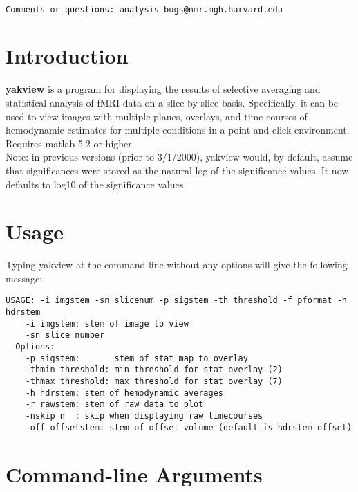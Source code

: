 \documentclass[10pt]{article}
\begin{document}
\begin{Large}
 \\
\end{Large}

\noindent 
\begin{verbatim}
Comments or questions: analysis-bugs@nmr.mgh.harvard.edu
\end{verbatim}

\section{Introduction}
{\bf yakview} is a program for displaying the results of selective
averaging and statistical analysis of fMRI data on a slice-by-slice
basis. Specifically, it can be used to view images with multiple
planes, overlays, and time-courses of hemodynamic estimates for
multiple conditions in a point-and-click environment. Requires matlab
5.2 or higher.\\

Note: in previous versions (prior to 3/1/2000), yakview would, by
default, assume that significances were stored as the natural log of
the significance values.  It now defaults to log10 of the significance
values.

\section{Usage}
Typing yakview at the command-line without any options will give the
following message:\\ 

\begin{small}
\begin{verbatim}
USAGE: -i imgstem -sn slicenum -p sigstem -th threshold -f pformat -h hdrstem
    -i imgstem: stem of image to view
    -sn slice number
  Options:
    -p sigstem:       stem of stat map to overlay
    -thmin threshold: min threshold for stat overlay (2)
    -thmax threshold: max threshold for stat overlay (7)
    -h hdrstem: stem of hemodynamic averages
    -r rawstem: stem of raw data to plot
    -nskip n  : skip when displaying raw timecourses
    -off offsetstem: stem of offset volume (default is hdrstem-offset)
\end{verbatim}
\end{small}

\section{Command-line Arguments}
\end{document}
